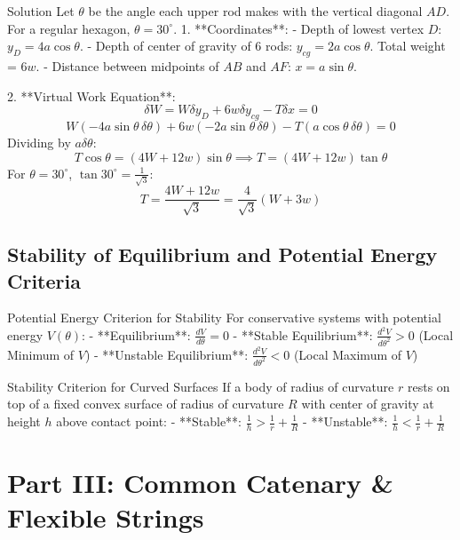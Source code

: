 \documentclass[11pt,a4paper]{article}
\begin{document}
\begin{proofbox}{Solution}
Let $\theta$ be the angle each upper rod makes with the vertical diagonal $AD$. For a regular hexagon, $\theta = 30^\circ$.
1. **Coordinates**:
   - Depth of lowest vertex $D$: $y_D = 4a\cos\theta$.
   - Depth of center of gravity of 6 rods: $y_{cg} = 2a\cos\theta$. Total weight = $6w$.
   - Distance between midpoints of $AB$ and $AF$: $x = a\sin\theta$.

2. **Virtual Work Equation**:
   \[
   \delta W = W \delta y_D + 6w \delta y_{cg} - T \delta x = 0
   \]
   \[
   W(-4a\sin\theta \, \delta\theta) + 6w(-2a\sin\theta \, \delta\theta) - T(a\cos\theta \, \delta\theta) = 0
   \]
   Dividing by $a\delta\theta$:
   \[
   T\cos\theta = (4W + 12w)\sin\theta \implies T = (4W + 12w)\tan\theta
   \]
   For $\theta = 30^\circ$, $\tan 30^\circ = \frac{1}{\sqrt{3}}$:
   \begin{equation}
   T = \frac{4W + 12w}{\sqrt{3}} = \frac{4}{\sqrt{3}}(W + 3w)
   \end{equation}
\end{proofbox}

\subsection{Stability of Equilibrium and Potential Energy Criteria}

\begin{theorembox}{Potential Energy Criterion for Stability}
For conservative systems with potential energy $V(\theta)$:
- **Equilibrium**: $\frac{dV}{d\theta} = 0$
- **Stable Equilibrium**: $\frac{d^2V}{d\theta^2} > 0$ (Local Minimum of $V$)
- **Unstable Equilibrium**: $\frac{d^2V}{d\theta^2} < 0$ (Local Maximum of $V$)
\end{theorembox}

\begin{theorembox}{Stability Criterion for Curved Surfaces}
If a body of radius of curvature $r$ rests on top of a fixed convex surface of radius of curvature $R$ with center of gravity at height $h$ above contact point:
- **Stable**: $\frac{1}{h} > \frac{1}{r} + \frac{1}{R}$
- **Unstable**: $\frac{1}{h} < \frac{1}{r} + \frac{1}{R}$
\end{theorembox}

\section{Part III: Common Catenary \& Flexible Strings}
\end{document}
